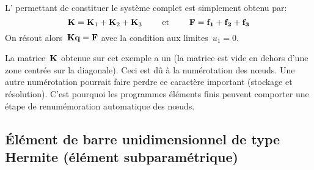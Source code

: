 \medskipvm
L' permettant de constituer le système complet est simplement obtenu par:
\begin{equation} \MM{K}=\MM{K}_1+\MM{K}_2+\MM{K}_3 \qquad \text{ et } \qquad \VV{F}=\VV{f_1}+\VV{f_2}+\VV{f_3} \end{equation}
\medskipvm
On résout alors~$\MM{K}\VV{q}=\VV{F}$ avec la condition aux limites~$u_1=0$.

\medskip
\begin{remarque}
La matrice~$\MM{K}$ obtenue sur cet exemple a un  (la matrice est vide en dehors d'une zone centrée sur la diagonale). Ceci est dû à la numérotation des nœuds. Une autre numérotation pourrait faire perdre ce caractère important (stockage et résolution).
C'est pourquoi les programmes éléments finis peuvent comporter une étape de renumémoration automatique des nœuds.
\end{remarque}

\medskip
\subsection{Élément de barre unidimensionnel de type Hermite (élément subparamétrique)}


